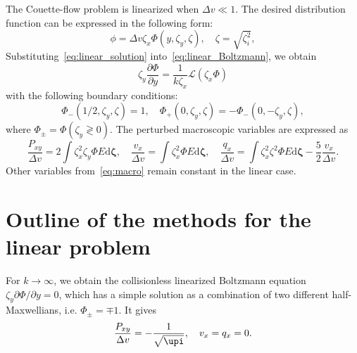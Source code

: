 \documentclass[final]{jfm} %
\newcommand{\dd}{\mathrm{d}}
\newcommand{\pder}[2][]{\frac{\partial#1}{\partial#2}}
\newcommand{\Pder}[2][]{\partial#1/\partial#2}
\newcommand{\dzeta}{\boldsymbol{\dd\zeta}}
\begin{document}
The Couette-flow problem is linearized when \(\Delta{v}\ll 1\).
The desired distribution function can be expressed in the following form:
\begin{equation}\label{eq:linear_solution}
    \phi = \Delta{v} \zeta_x \Phi(y,\zeta_y,\zeta), \quad \zeta = \sqrt{\zeta_i^2},
\end{equation}
Substituting~\eqref{eq:linear_solution} into~\eqref{eq:linear_Boltzmann}, we obtain
\begin{equation}\label{eq:linear_equation}
    \zeta_y \pder[\Phi]{y} = \frac1{k\zeta_x}\mathcal{L}(\zeta_x\Phi)
\end{equation}
with the following boundary conditions:
\begin{equation}\label{eq:linear_bc}
    \Phi_-(1/2,\zeta_y,\zeta) = 1, \quad \Phi_+(0,\zeta_y,\zeta) = -\Phi_-(0,-\zeta_y,\zeta),
\end{equation}
where \(\Phi_\pm = \Phi(\zeta_y \gtrless 0)\).
The perturbed macroscopic variables are expressed as
\begin{equation}\label{eq:linear_macro}
    \frac{P_{xy}}{\Delta{v}} = 2\int \zeta_x^2 \zeta_y \Phi E\dzeta, \quad
    \frac{v_x}{\Delta{v}} = \int \zeta_x^2 \Phi E\dzeta, \quad
    \frac{q_x}{\Delta{v}} = \int \zeta_x^2 \zeta^2 \Phi E\dzeta - \frac52 \frac{v_x}{\Delta{v}}.
\end{equation}
Other variables from~\eqref{eq:macro} remain constant in the linear case.

\section{Outline of the methods for the linear problem}

For \(k\to\infty\), we obtain the collisionless linearized Boltzmann equation \(\zeta_y\Pder[\Phi]{y} = 0\),
which has a simple solution as a combination of two different half-Maxwellians, i.e. \(\Phi_\pm = \mp 1\).
It gives
\begin{gather}\label{eq:linear_free_macro}
    \frac{P_{xy}}{\Delta{v}} = -\frac1{\sqrt{\upi}}, \quad v_x = q_x = 0.
\end{gather}
\end{document}
